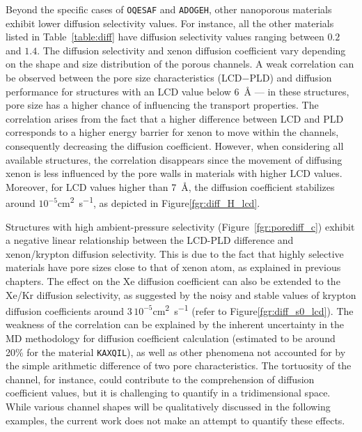 \documentclass[main]{subfiles}
\begin{document}
Beyond the specific cases of \texttt{OQESAF} and \texttt{ADOGEH}, other nanoporous materials exhibit lower diffusion selectivity values. For instance, all the other materials listed in Table~\ref{table:diff} have diffusion selectivity values ranging between $0.2$ and $1.4$. The diffusion selectivity and xenon diffusion coefficient vary depending on the shape and size distribution of the porous channels. A weak correlation can be observed between the pore size characteristics (LCD$-$PLD) and diffusion performance for structures with an LCD value below \SI{6}{\angstrom} --- in these structures, pore size has a higher chance of influencing the transport properties. The correlation arises from the fact that a higher difference between LCD and PLD corresponds to a higher energy barrier for xenon to move within the channels, consequently decreasing the diffusion coefficient. However, when considering all available structures, the correlation disappears since the movement of diffusing xenon is less influenced by the pore walls in materials with higher LCD values. Moreover, for LCD values higher than \SI{7}{\angstrom}, the diffusion coefficient stabilizes around $10^{-5}$\si{\square\cm\per\s}, as depicted in Figure\ref{fgr:diff_H_lcd}. 

Structures with high ambient-pressure selectivity (Figure~\ref{fgr:porediff_c}) exhibit a negative linear relationship between the LCD-PLD difference and xenon/krypton diffusion selectivity. This is due to the fact that highly selective materials have pore sizes close to that of xenon atom, as explained in previous chapters. The effect on the Xe diffusion coefficient can also be extended to the Xe/Kr diffusion selectivity, as suggested by the noisy and stable values of krypton diffusion coefficients around $3\,10^{-5}$\si{\square\cm\per\s} (refer to Figure\ref{fgr:diff_s0_lcd}). The weakness of the correlation can be explained by the inherent uncertainty in the MD methodology for diffusion coefficient calculation (estimated to be around {20\%} for the material \texttt{KAXQIL}), as well as other phenomena not accounted for by the simple arithmetic difference of two pore characteristics. The tortuosity of the channel, for instance, could contribute to the comprehension of diffusion coefficient values, but it is challenging to quantify in a tridimensional space. While various channel shapes will be qualitatively discussed in the following examples, the current work does not make an attempt to quantify these effects.
\end{document}
